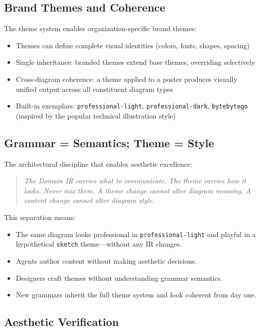 \subsection{Brand Themes and Coherence}

The theme system enables organization-specific brand themes:

\begin{itemize}
  \item Themes can define complete visual identities (colors, fonts, shapes, spacing)
  \item Single inheritance: branded themes extend base themes, overriding selectively
  \item Cross-diagram coherence: a theme applied to a poster produces visually unified
        output across all constituent diagram types
  \item Built-in exemplars: \texttt{professional-light}, \texttt{professional-dark},
        \texttt{bytebytego} (inspired by the popular technical illustration style)
\end{itemize}

\subsection{Grammar = Semantics; Theme = Style}

The architectural discipline that enables aesthetic excellence:

\begin{quote}
\emph{The Domain IR carries what to communicate. The theme carries how it looks.
Never mix them. A theme change cannot alter diagram meaning. A content change
cannot alter diagram style.}
\end{quote}

This separation means:
\begin{itemize}
  \item The same diagram looks professional in \texttt{professional-light} and playful
        in a hypothetical \texttt{sketch} theme---without any IR changes.
  \item Agents author content without making aesthetic decisions.
  \item Designers craft themes without understanding grammar semantics.
  \item New grammars inherit the full theme system and look coherent from day one.
\end{itemize}

\subsection{Aesthetic Verification}

